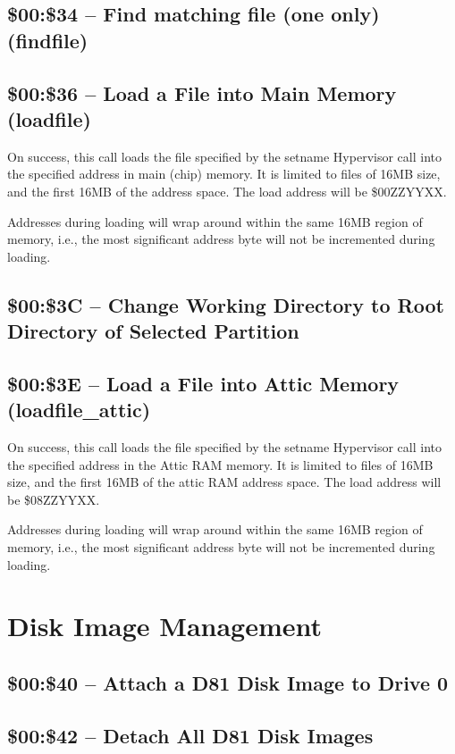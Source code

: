 \subsection{\$00:\$34 -- Find matching file (one only) (findfile)}
\subsection{\$00:\$36 -- Load a File into Main Memory (loadfile)}

On success, this call loads the file specified by the setname Hypervisor call into the specified
address in main (chip) memory.  It is limited to files of 16MB size, and the first 16MB of
the address space.  The load address will be \$00ZZYYXX.

Addresses during loading will wrap around within the same 16MB region of memory, i.e., the most
significant address byte will not be incremented during loading.

\subsection{\$00:\$3C -- Change Working Directory to Root Directory of Selected Partition}
\subsection{\$00:\$3E -- Load a File into Attic Memory (loadfile\_attic)}

On success, this call loads the file specified by the setname Hypervisor call into the specified
address in the Attic RAM memory.  It is limited to files of 16MB size, and the first 16MB of
the attic RAM address space.  The load address will be \$08ZZYYXX.

Addresses during loading will wrap around within the same 16MB region of memory, i.e., the most
significant address byte will not be incremented during loading.

\section{Disk Image Management}

\subsection{\$00:\$40 -- Attach a D81 Disk Image to Drive 0}
\subsection{\$00:\$42 -- Detach All D81 Disk Images}

